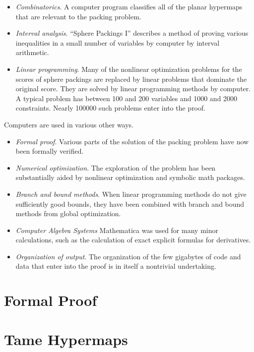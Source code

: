 \begin{itemize}
\item {\it Combinatorics}.  A computer program classifies all of the
  planar hypermaps that are relevant to the packing problem.
\item {\it  Interval analysis}.  ``Sphere Packings
I'' describes a method of proving various inequalities in a small number
of variables by computer by interval arithmetic.
\item {\it  Linear programming}.  Many of the nonlinear optimization
problems for the scores of sphere packings are replaced by linear
problems that dominate the original score.  They are solved
by linear programming methods by computer.  A typical problem has
between 100 and 200 variables and 1000 and 2000 constraints.  Nearly
100000
such problems enter into the proof.
\end{itemize}

Computers are used in various other ways.  


\begin{itemize}
\item {\it Formal proof}.
Various parts of the solution of the packing problem have now been
formally verified.
\item  {\it Numerical optimization}.  The exploration of the problem
has been substantially
aided by nonlinear optimization and symbolic math packages.
\item {\it Branch and bound methods}.  When linear programming methods
  do not give sufficiently good bounds, they have been combined with
  branch and bound methods from global optimization.
\item {\it Computer Algebra Systems} Mathematica was used for many
  minor calculations, such as the calculation of exact explicit
  formulas for derivatives.
\item {\it Organization of output}.
The organization of the few gigabytes of code and data that
enter into the proof is in itself a nontrivial undertaking.
\end{itemize}



\section{Formal Proof}


\section{Tame Hypermaps}

